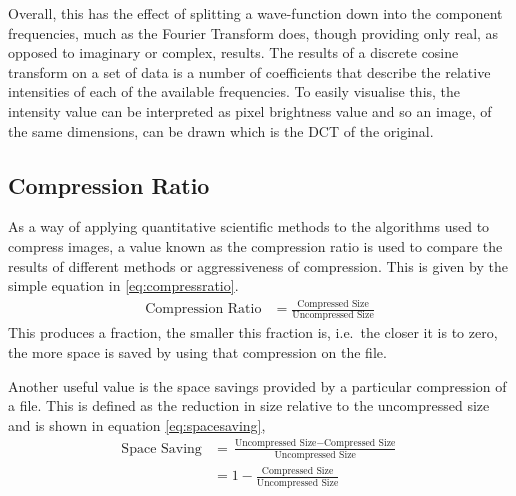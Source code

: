 		Overall, this has the effect of splitting a wave-function down into the component frequencies, much as the Fourier Transform does, though providing only real, as opposed to imaginary or complex, results. The results of a discrete cosine transform on a set of data is a number of coefficients that describe the relative intensities of each of the available frequencies. To easily visualise this, the intensity value can be interpreted as pixel brightness value and so an image, of the same dimensions, can be drawn which is the DCT of the original.

	\subsection{Compression Ratio} %
		\label{sub:compression_ratio}
		As a way of applying quantitative scientific methods to the algorithms used to compress images, a value known as the compression ratio is used to compare the results of different methods or aggressiveness of compression. This is given by the simple equation in \ref{eq:compressratio}.
		\begin{align}
			\text{Compression Ratio} &= \frac{\text{Compressed Size}}{\text{Uncompressed Size}} \label{eq:compressratio}
		\end{align}
		This produces a fraction, the smaller this fraction is, i.e.\ the closer it is to zero, the more space is saved by using that compression on the file.

		Another useful value is the space savings provided by a particular compression of a file. This is defined as the reduction in size relative to the uncompressed size and is shown in equation \ref{eq:spacesaving},
		\begin{align}
			\text{Space Saving} &= \frac{\text{Uncompressed Size} - \text{Compressed Size}}{\text{Uncompressed Size}} \\
			 &= 1- \frac{\text{Compressed Size}}{\text{Uncompressed Size}} \label{eq:spacesaving}
		\end{align}

